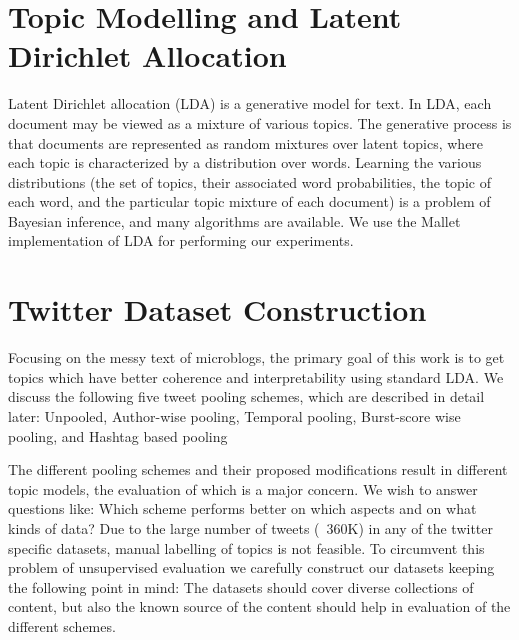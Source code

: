 \documentclass[10pt,a5paper,twoside]{article}
\begin{document}
\section{Topic Modelling and Latent Dirichlet Allocation}

Latent Dirichlet allocation (LDA) \cite{blei03} is a generative model
for text. In LDA, each document may be viewed as a mixture of various
topics.  The generative process is that documents are
represented as random mixtures over latent topics, where each topic is
characterized by a distribution over words.  Learning the various
distributions (the set of topics, their associated word probabilities,
the topic of each word, and the particular topic mixture of each
document) is a problem of Bayesian inference, and many algorithms are
available.  We use the Mallet \cite{mallet} implementation of LDA for
performing our experiments.


\section{Twitter Dataset Construction}


Focusing on the messy text of microblogs, the primary goal of this work is to get topics which have better coherence and interpretability using standard LDA. We discuss the following five tweet pooling schemes, which are described in detail later: Unpooled, Author-wise pooling, Temporal pooling,
Burst-score wise pooling, and Hashtag based pooling

The different pooling schemes and their proposed modifications result in different topic models, the evaluation of which is a major concern. We wish to answer questions like: Which scheme performs better on which aspects and on what kinds of data? Due to the large number of tweets (~360K) in any of the twitter specific datasets, manual labelling of topics is not feasible.
 To circumvent this problem of unsupervised evaluation we carefully construct our datasets keeping the following point in mind:
The datasets should cover diverse collections of content,
but also the known source of the content
should help in evaluation of the different schemes.
\end{document}
